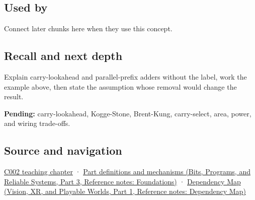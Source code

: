 \subsection{Used by}\label{appendix-b5c46b2d94ff-used-by}

\hypertarget{appendix-b5c46b2d94ff-used-by}{}

Connect later chunks here when they use this concept.

\subsection{Recall and next depth}\label{appendix-b5c46b2d94ff-recall-and-next-depth}

\hypertarget{appendix-b5c46b2d94ff-recall-and-next-depth}{}

Explain carry-lookahead and parallel-prefix adders without the label, work the example above, then state the assumption whose removal would change the result.

\textbf{Pending:} carry-lookahead, Kogge-Stone, Brent-Kung, carry-select, area, power, and wiring trade-offs.

\subsection{Source and navigation}\label{appendix-b5c46b2d94ff-source-and-navigation}

\hypertarget{appendix-b5c46b2d94ff-source-and-navigation}{}

\hyperref[01-foundations-i-ch001-arithmetic-becomes-a-policy]{C002 teaching chapter} · \href{../01-Bits-Programs-and-Reliable-Systems-P03/main.pdf\#appendix-fd090d982a15}{Part definitions and mechanisms (Bits, Programs, and Reliable Systems, Part 3, Reference notes: Foundations)} · \href{../07-Vision-XR-and-Playable-Worlds-P01/main.pdf\#appendix-4ad47bdd269a}{Dependency Map (Vision, XR, and Playable Worlds, Part 1, Reference notes: Dependency Map)}

